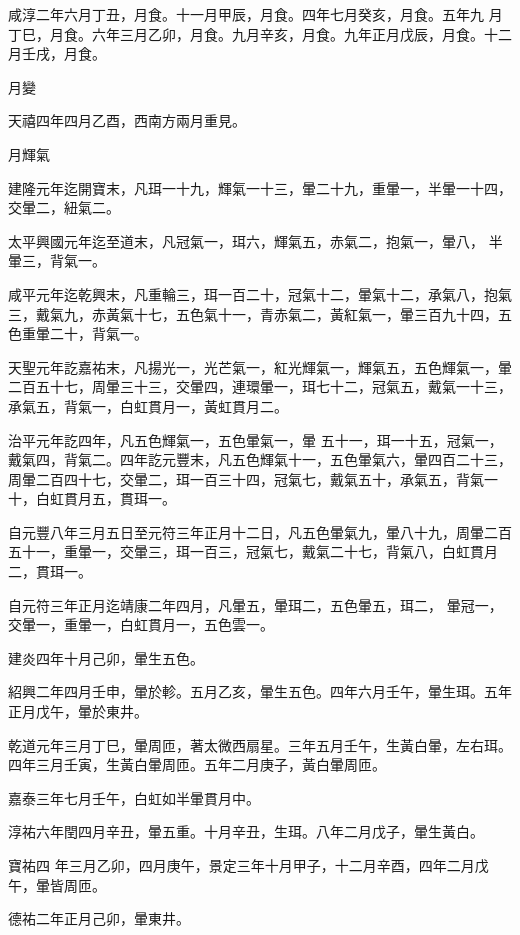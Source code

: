 \begin{pinyinscope}
 咸淳二年六月丁丑，月食。十一月甲辰，月食。四年七月癸亥，月食。五年九
 月丁巳，月食。六年三月乙卯，月食。九月辛亥，月食。九年正月戊辰，月食。十二月壬戌，月食。



 月變



 天禧四年四月乙酉，西南方兩月重見。



 月輝氣



 建隆元年迄開寶末，凡珥一十九，輝氣一十三，暈二十九，重暈一，半暈一十四，交暈二，紐氣二。



 太平興國元年迄至道末，凡冠氣一，珥六，輝氣五，赤氣二，抱氣一，暈八，
 半暈三，背氣一。



 咸平元年迄乾興末，凡重輪三，珥一百二十，冠氣十二，暈氣十二，承氣八，抱氣三，戴氣九，赤黃氣十七，五色氣十一，青赤氣二，黃紅氣一，暈三百九十四，五色重暈二十，背氣一。



 天聖元年訖嘉祐末，凡揚光一，光芒氣一，紅光輝氣一，輝氣五，五色輝氣一，暈二百五十七，周暈三十三，交暈四，連環暈一，珥七十二，冠氣五，戴氣一十三，承氣五，背氣一，白虹貫月一，黃虹貫月二。



 治平元年訖四年，凡五色輝氣一，五色暈氣一，暈
 五十一，珥一十五，冠氣一，戴氣四，背氣二。四年訖元豐末，凡五色輝氣十一，五色暈氣六，暈四百二十三，周暈二百四十七，交暈二，珥一百三十四，冠氣七，戴氣五十，承氣五，背氣一十，白虹貫月五，貫珥一。



 自元豐八年三月五日至元符三年正月十二日，凡五色暈氣九，暈八十九，周暈二百五十一，重暈一，交暈三，珥一百三，冠氣七，戴氣二十七，背氣八，白虹貫月二，貫珥一。



 自元符三年正月迄靖康二年四月，凡暈五，暈珥二，五色暈五，珥二，
 暈冠一，交暈一，重暈一，白虹貫月一，五色雲一。



 建炎四年十月己卯，暈生五色。



 紹興二年四月壬申，暈於軫。五月乙亥，暈生五色。四年六月壬午，暈生珥。五年正月戊午，暈於東井。



 乾道元年三月丁巳，暈周匝，著太微西扇星。三年五月壬午，生黃白暈，左右珥。四年三月壬寅，生黃白暈周匝。五年二月庚子，黃白暈周匝。



 嘉泰三年七月壬午，白虹如半暈貫月中。



 淳祐六年閏四月辛丑，暈五重。十月辛丑，生珥。八年二月戊子，暈生黃白。



 寶祐四
 年三月乙卯，四月庚午，景定三年十月甲子，十二月辛酉，四年二月戊午，暈皆周匝。



 德祐二年正月己卯，暈東井。



\end{pinyinscope}